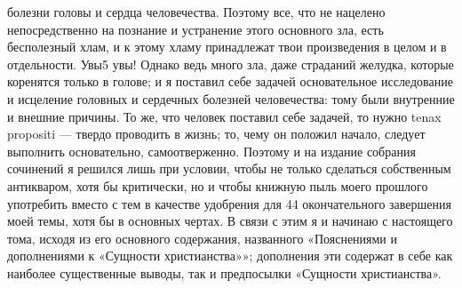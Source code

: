 \documentclass[12pt]{article}
\begin{document}
болезни головы и сердца человечества. Поэтому все, что 
не нацелено непосредственно на познание и устранение 
этого основного зла, есть бесполезный хлам, и к этому 
хламу принадлежат твои произведения в целом и в  
отдельности. Увы5 увы! Однако ведь много зла, даже  
страданий желудка, которые коренятся только в голове; и 
я поставил себе задачей основательное исследование 
и исцеление головных и сердечных болезней  
человечества: тому были внутренние и внешние причины. То 
же, что человек поставил себе задачей, то нужно tenax 
propositi — твердо проводить в жизнь; то, чему он  
положил начало, следует выполнить основательно,  
самоотверженно. Поэтому и на издание собрания  
сочинений я решился лишь при условии, чтобы не 
только сделаться собственным антикваром, хотя бы  
критически, но и чтобы книжную пыль моего прошлого 
употребить вместо с тем в качестве удобрения для 
44 
окончательного завершения моей темы, хотя бы в  
основных чертах. В связи с этим я и начинаю с  
настоящего тома, исходя из его основного содержания,  
названного «Пояснениями и дополнениями к «Сущности  
христианства»»; дополнения эти содержат в себе как  
наиболее существенные выводы, так и предпосылки  
«Сущности христианства». 
\end{document}
